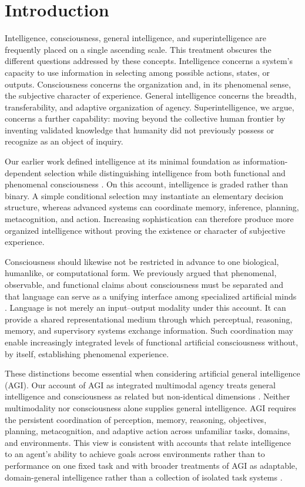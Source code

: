 \section{\textbf{Introduction}}
\label{sec:introduction}

Intelligence, consciousness, general intelligence, and superintelligence are
frequently placed on a single ascending scale. This treatment obscures the
different questions addressed by these concepts. Intelligence concerns a
system's capacity to use information in selecting among possible actions,
states, or outputs. Consciousness concerns the organization and, in its
phenomenal sense, the subjective character of experience. General intelligence
concerns the breadth, transferability, and adaptive organization of agency.
Superintelligence, we argue, concerns a further capability: moving beyond the
collective human frontier by inventing validated knowledge that humanity did
not previously possess or recognize as an object of inquiry.

Our earlier work defined intelligence at its minimal foundation as
information-dependent selection while distinguishing intelligence from both
functional and phenomenal consciousness \cite{zohourian2026intelligence}. On
this account, intelligence is graded rather than binary. A simple conditional
selection may instantiate an elementary decision structure, whereas advanced
systems can coordinate memory, inference, planning, metacognition, and action.
Increasing sophistication can therefore produce more organized intelligence
without proving the existence or character of subjective experience.

Consciousness should likewise not be restricted in advance to one biological,
humanlike, or computational form. We previously argued that phenomenal,
observable, and functional claims about consciousness must be separated and
that language can serve as a unifying interface among specialized artificial
minds \cite{zohourian2026language}. Language is not merely an input--output
modality under this account. It can provide a shared representational medium
through which perceptual, reasoning, memory, and supervisory systems exchange
information. Such coordination may enable increasingly integrated levels of
functional artificial consciousness without, by itself, establishing
phenomenal experience.

These distinctions become essential when considering artificial general
intelligence (AGI). Our account of AGI as integrated multimodal agency treats
general intelligence and consciousness as related but non-identical dimensions
\cite{zohourian2026agi}. Neither multimodality nor consciousness alone supplies
general intelligence. AGI requires the persistent coordination of perception,
memory, reasoning, objectives, planning, metacognition, and adaptive action
across unfamiliar tasks, domains, and environments. This view is consistent
with accounts that relate intelligence to an agent's ability to achieve goals
across environments rather than to performance on one fixed task
\cite{legg2007universal} and with broader treatments of AGI as adaptable,
domain-general intelligence rather than a collection of isolated task systems
\cite{goertzel2014agi}.

